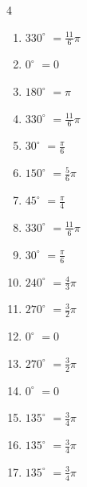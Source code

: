 \begin{multicols}{4}
\begin{enumerate}
  \item $\displaystyle 330^{\circ}$
        $\displaystyle =\frac{11}{6}\pi$

  \item $\displaystyle 0^{\circ}$
        $\displaystyle =0$

  \item $\displaystyle 180^{\circ}$
        $\displaystyle =\pi$

  \item $\displaystyle 330^{\circ}$
        $\displaystyle =\frac{11}{6}\pi$

  \item $\displaystyle 30^{\circ}$
        $\displaystyle =\frac{\pi}{6}$

  \item $\displaystyle 150^{\circ}$
        $\displaystyle =\frac{5}{6}\pi$

  \item $\displaystyle 45^{\circ}$
        $\displaystyle =\frac{\pi}{4}$

  \item $\displaystyle 330^{\circ}$
        $\displaystyle =\frac{11}{6}\pi$

\columnbreak %

  \item $\displaystyle 30^{\circ}$
        $\displaystyle =\frac{\pi}{6}$

  \item $\displaystyle 240^{\circ}$
        $\displaystyle =\frac{4}{3}\pi$

  \item $\displaystyle 270^{\circ}$
        $\displaystyle =\frac{3}{2}\pi$

  \item $\displaystyle 0^{\circ}$
        $\displaystyle =0$

  \item $\displaystyle 270^{\circ}$
        $\displaystyle =\frac{3}{2}\pi$

  \item $\displaystyle 0^{\circ}$
        $\displaystyle =0$

  \item $\displaystyle 135^{\circ}$
        $\displaystyle =\frac{3}{4}\pi$

  \item $\displaystyle 135^{\circ}$
        $\displaystyle =\frac{3}{4}\pi$

  \item $\displaystyle 135^{\circ}$
        $\displaystyle =\frac{3}{4}\pi$


\end{enumerate}
\end{multicols}
